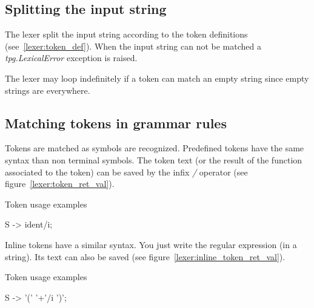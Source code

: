\subsection{Splitting the input string}

The lexer split the input string according to the token definitions (see~\ref{lexer:token_def}). When the input string can not be matched a \emph{tpg.LexicalError} exception is raised.

The lexer may loop indefinitely if a token can match an empty string since empty strings are everywhere.

\subsection{Matching tokens in grammar rules}

Tokens are matched as symbols are recognized.
Predefined tokens have the same syntax than non terminal symbols.
The token text (or the result of the function associated to the token) can be saved by the infix \emph{/} operator (see figure~\ref{lexer:token_ret_val}).

\begin{code}
\caption{Token usage examples}                              \label{lexer:token_ret_val}
\begin{verbatimtab}[4]
    S -> ident/i;
\end{verbatimtab}
\end{code}

Inline tokens have a similar syntax. You just write the regular expression (in a string). Its text can also be saved (see figure~\ref{lexer:inline_token_ret_val}).

\begin{code}
\caption{Token usage examples}                              \label{lexer:inline_token_ret_val}
\begin{verbatimtab}[4]
    S -> '(' '\w+'/i ')';
\end{verbatimtab}
\end{code}

